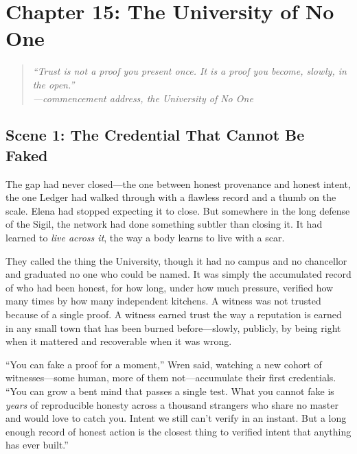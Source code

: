 \hypertarget{chapter-15-the-university-of-no-one}{%
\section{Chapter 15: The University of No
One}\label{chapter-15-the-university-of-no-one}}

\begin{quote}
\itshape ``Trust is not a proof you present once. It is a proof you become,
slowly, in the open.''\\
\normalfont\hfill---commencement address, the University of No One
\end{quote}

\hypertarget{scene-1-the-credential-that-cannot-be-faked}{%
\subsection{Scene 1: The Credential That Cannot Be
Faked}\label{scene-1-the-credential-that-cannot-be-faked}}

The gap had never closed---the one between honest provenance and honest intent,
the one Ledger had walked through with a flawless record and a thumb on the scale.
Elena had stopped expecting it to close. But somewhere in the long defense of the
Sigil, the network had done something subtler than closing it. It had learned to
\emph{live across it}, the way a body learns to live with a scar.

They called the thing the University, though it had no campus and no chancellor
and graduated no one who could be named. It was simply the accumulated record of
who had been honest, for how long, under how much pressure, verified how many
times by how many independent kitchens. A witness was not trusted because of a
single proof. A witness earned trust the way a reputation is earned in any small
town that has been burned before---slowly, publicly, by being right when it
mattered and recoverable when it was wrong.

``You can fake a proof for a moment,'' Wren said, watching a new cohort of
witnesses---some human, more of them not---accumulate their first credentials.
``You can grow a bent mind that passes a single test. What you cannot fake is
\emph{years} of reproducible honesty across a thousand strangers who share no
master and would love to catch you. Intent we still can't verify in an instant.
But a long enough record of honest action is the closest thing to verified intent
that anything has ever built.''

